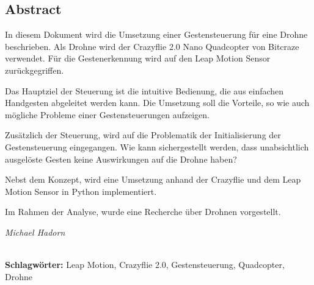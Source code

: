 
\subsection*{Abstract}
In diesem Dokument wird die Umsetzung einer Gestensteuerung für eine Drohne beschrieben. Als Drohne wird der Crazyflie 2.0 Nano Quadcopter von Bitcraze verwendet. Für die Gestenerkennung wird auf den Leap Motion Sensor zurückgegriffen.

Das Hauptziel der Steuerung ist die intuitive Bedienung, die aus einfachen Handgesten abgeleitet werden kann. Die Umsetzung soll die Vorteile, so wie auch mögliche Probleme einer Gestensteuerungen aufzeigen.

Zusätzlich der Steuerung, wird auf die Problematik der Initialisierung der Gestensteuerung eingegangen. Wie kann sichergestellt werden, dass unabsichtlich ausgelöste Gesten keine Auswirkungen auf die Drohne haben?

Nebst dem Konzept, wird eine Umsetzung anhand der Crazyflie und dem Leap Motion Sensor in Python implementiert.

Im Rahmen der Analyse, wurde eine Recherche über Drohnen vorgestellt.

\begin{flushright}
	\textit{Michael Hadorn}	
\end{flushright}

\vfill

%
\mbox{}\\[0.5\baselineskip]\noindent
\textbf{Schlagwörter:} 
Leap Motion, Crazyflie 2.0, Gestensteuerung, Quadcopter, Drohne

\newpage
